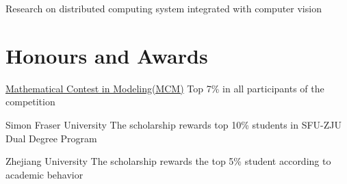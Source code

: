 \documentclass[12pt,a4paper,sans]{moderncv}   %
\begin{document}
{Research on distributed computing system integrated with computer vision%
}




\section{Honours and Awards}
{\href{https://www.comap.com/undergraduate/contests/mcm/}{Mathematical Contest in Modeling(MCM)}}
{}
{}
{
Top 7\% in all participants of the competition
}


{Simon Fraser University}
{}
{}
{The scholarship rewards top 10\% students in SFU-ZJU Dual Degree Program}

{Zhejiang University}
{}
{}
{The scholarship rewards the top 5\% student according to academic behavior}


\end{document}
